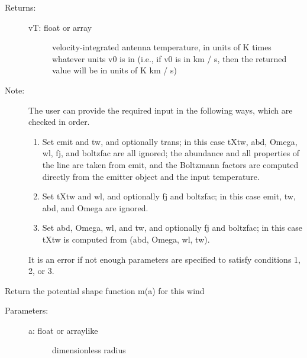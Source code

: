 \documentclass[letterpaper,10pt,english]{sphinxmanual}
\begin{document}
\begin{fulllineitems}
\begin{fulllineitems}
\begin{description}
\begin{description}
\end{description}

\item[{Returns:}] \leavevmode\begin{description}
\item[{vT: float or array}] \leavevmode
velocity-integrated antenna temperature, in units of K
times whatever units v0 is in (i.e., if v0 is in km / s,
then the returned value will be in units of K km / s)

\end{description}

\item[{Note:}] \leavevmode
The user can provide the required input in the following
ways, which are checked in order.
\begin{enumerate}
\item {} 
Set emit and tw, and optionally trans; in this case
tXtw, abd, Omega, wl, fj, and boltzfac are all ignored;
the abundance and all properties of the line are taken
from emit, and the Boltzmann factors are computed
directly from the emitter object and the input
temperature.

\item {} 
Set tXtw and wl, and optionally fj and boltzfac; in this
case emit, tw, abd, and Omega are ignored.

\item {} 
Set abd, Omega, wl, and tw, and optionally fj and
boltzfac; in this case tXtw is computed from (abd,
Omega, wl, tw).

\end{enumerate}

It is an error if not enough parameters are specified to
satisfy conditions 1, 2, or 3.

\end{description}

\end{fulllineitems}


\begin{fulllineitems}
\label{fulldoc:despotic.winds.pwind.m}
Return the potential shape function m(a) for this wind
\begin{description}
\item[{Parameters:}] \leavevmode\begin{description}
\item[{a: float or arraylike}] \leavevmode
dimensionless radius


\end{description}
\end{description}
\end{fulllineitems}
\end{fulllineitems}
\end{document}
